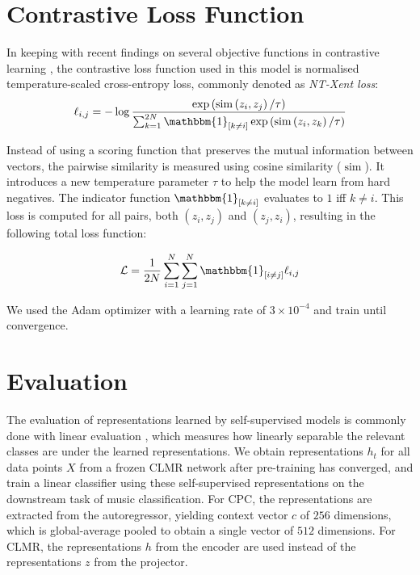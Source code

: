 \section{Contrastive Loss Function}
In keeping with recent findings on several objective functions in contrastive learning \cite{chen_simple_2020}, the contrastive loss function used in this model is normalised temperature-scaled cross-entropy loss, commonly denoted as \emph{NT-Xent loss}:
\begin{equation}
    \label{ntxent_loss}
    \ell_{i, j}=-\log \frac{\exp \left(\operatorname{sim}\left(z_{i}, z_{j}\right) / \tau\right)}{\sum_{k=1}^{2 N} \mathbbm{1}_{[k \neq i]} \exp \left(\operatorname{sim}\left(z_{i}, z_{k}\right) / \tau\right)}
\end{equation}

Instead of using a scoring function that preserves the mutual information between vectors, the pairwise similarity is measured using cosine similarity ($\operatorname{sim}$).
It introduces a new temperature parameter $\tau$ to help the model learn from hard negatives.
The indicator function $\mathbbm{1}_{[k \neq i]}$ evaluates to $1$ iff $k\neq i$.
This loss is computed for all pairs, both $(z_i, z_j)$ and $(z_j, z_i)$, resulting in the following total loss function:

\begin{equation}
    \label{total_xent_loss}
    \mathcal{L} = \frac{1}{2N}\sum_{i=1}^{N}\sum_{j=1}^{N} \mathbbm{1}_{[i\neq j]}\ell_{i, j}
\end{equation}

We used the Adam optimizer \cite{adam_optimizer} with a learning rate of $3\times10^{-4}$ and train until convergence.


\section{Evaluation}
\label{evaluation}
The evaluation of representations learned by self-supervised models is commonly done with linear evaluation \cite{oord_representation_2019,hjelm_learning_2019,chen_simple_2020}, which measures how linearly separable the relevant classes are under the learned representations.
We obtain representations $h_t$ for all data points $X$ from a frozen CLMR network after pre-training has converged, and train a linear classifier using these self-supervised representations on the downstream task of music classification.
For CPC, the representations are extracted from the autoregressor, yielding context vector $c$ of $256$ dimensions, which is global-average pooled to obtain a single vector of $512$ dimensions.
For CLMR, the representations $h$ from the encoder are used instead of the representations $z$ from the projector.


